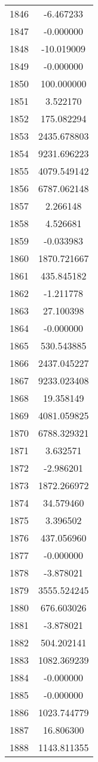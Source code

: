 \documentclass[12pt]{article}
\begin{document}
\begin{longtable}{@{}cc@{}}
1846 & -6.467233 \\
1847 & -0.000000 \\
1848 & -10.019009 \\
1849 & -0.000000 \\
1850 & 100.000000 \\
1851 & 3.522170 \\
1852 & 175.082294 \\
1853 & 2435.678803 \\
1854 & 9231.696223 \\
1855 & 4079.549142 \\
1856 & 6787.062148 \\
1857 & 2.266148 \\
1858 & 4.526681 \\
1859 & -0.033983 \\
1860 & 1870.721667 \\
1861 & 435.845182 \\
1862 & -1.211778 \\
1863 & 27.100398 \\
1864 & -0.000000 \\
1865 & 530.543885 \\
1866 & 2437.045227 \\
1867 & 9233.023408 \\
1868 & 19.358149 \\
1869 & 4081.059825 \\
1870 & 6788.329321 \\
1871 & 3.632571 \\
1872 & -2.986201 \\
1873 & 1872.266972 \\
1874 & 34.579460 \\
1875 & 3.396502 \\
1876 & 437.056960 \\
1877 & -0.000000 \\
1878 & -3.878021 \\
1879 & 3555.524245 \\
1880 & 676.603026 \\
1881 & -3.878021 \\
1882 & 504.202141 \\
1883 & 1082.369239 \\
1884 & -0.000000 \\
1885 & -0.000000 \\
1886 & 1023.744779 \\
1887 & 16.806300 \\
1888 & 1143.811355 \\

\end{longtable}
\end{document}
